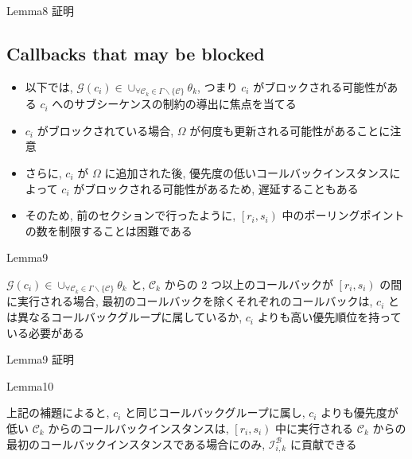 \begin{frame}{Lemma8 証明}
    \todo{}
\end{frame}


\subsection{Callbacks that may be blocked}
\label{ssec: callbacks_that_may_be_blocked}

\begin{frame}{}
    \begin{itemize}
        \item 以下では, $\mathcal{G}\left(c_{i}\right) \in \cup_{\forall \mathcal{C}_{k} \in \Gamma \backslash\{\mathcal{C}\}} \theta_{k}$, つまり $c_{i}$ がブロックされる可能性がある $c_{i}$ へのサブシーケンスの制約の導出に焦点を当てる
        \item $c_{i}$ がブロックされている場合, $\Omega$ が何度も更新される可能性があることに注意
        \item さらに, $c_{i}$ が $\Omega$ に追加された後, 優先度の低いコールバックインスタンスによって $c_{i}$ がブロックされる可能性があるため, 遅延することもある
        \item そのため, 前のセクションで行ったように, $\left[r_{i}, s_{i}\right)$ 中のポーリングポイントの数を制限することは困難である
    \end{itemize}
\end{frame}

\begin{frame}{Lemma9}
    \begin{lemma}[]
        $\mathcal{G}\left(c_{i}\right) \in \cup_{\forall \mathcal{C}_{k} \in \Gamma \backslash\{\mathcal{C}\}} \theta_{k}$ と, $\mathcal{C}_{k}$ からの 2 つ以上のコールバックが $\left[r_{i}, s_{i}\right)$ の間に実行される場合, 最初のコールバックを除くそれぞれのコールバックは, $c_{i}$ とは異なるコールバックグループに属しているか, $c_{i}$ よりも高い優先順位を持っている必要がある
    \end{lemma}
\end{frame}

\begin{frame}{Lemma9 証明}
    \todo{}
\end{frame}

\begin{frame}{Lemma10}
    \begin{lemma}[]
        上記の補題によると, $c_{i}$ と同じコールバックグループに属し, $c_{i}$ よりも優先度が低い $\mathcal{C}_{k}$ からのコールバックインスタンスは, $\left[r_{i}, s_{i}\right)$ 中に実行される $\mathcal{C}_{k}$ からの最初のコールバックインスタンスである場合にのみ, $\mathcal{I}_{i, k}^{\mathcal{B}}$ に貢献できる
    \end{lemma}
\end{frame}



